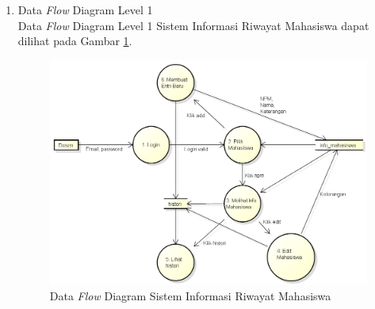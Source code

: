 \begin{enumerate}[(1)]
  \item Data {\it Flow} Diagram Level 1\\
  Data {\it Flow} Diagram Level 1 Sistem Informasi Riwayat Mahasiswa dapat dilihat
  pada Gambar \ref{fig:dfdl1}.
  
\begin{figure}[H]
\centering
\includegraphics[scale=0.5]{Gambar/dfdl1.png}
\caption[Data {\it Flow} Diagram Sistem Informasi Riwayat Mahasiswa]{Data {\it Flow}
Diagram Sistem Informasi Riwayat Mahasiswa}
\label{fig:dfdl1}
\end{figure}


\end{enumerate}
